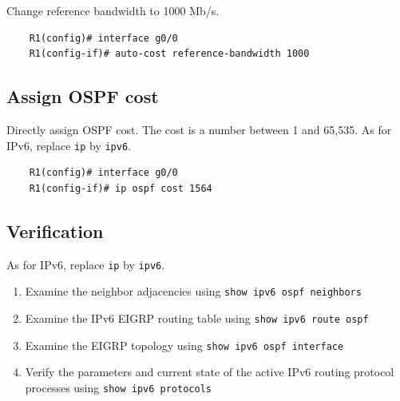 Change reference bandwidth to 1000 Mb/s.
	\begin{verbatim}
	R1(config)# interface g0/0
	R1(config-if)# auto-cost reference-bandwidth 1000
	\end{verbatim}
	
\subsection{Assign OSPF cost}	

Directly assign OSPF cost. The cost is a number between 1 and 65,535. As for IPv6, replace \verb|ip| by \verb|ipv6|.
	\begin{verbatim}
	R1(config)# interface g0/0
	R1(config-if)# ip ospf cost 1564
	\end{verbatim}

\subsection{Verification}
As for IPv6, replace \verb|ip| by \verb|ipv6|.
\begin{enumerate} 
\item Examine the neighbor adjacencies using \verb|show ipv6 ospf neighbors|
\item Examine the IPv6 EIGRP routing table using \verb|show ipv6 route ospf|
\item Examine the EIGRP topology using \verb|show ipv6 ospf interface|
\item Verify the parameters and current state of the active IPv6 routing protocol processes using \verb|show ipv6 protocols|	
\end{enumerate}